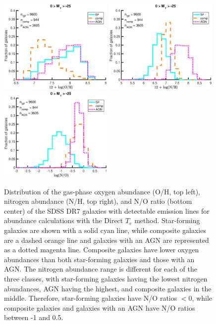 \begin{figure}
    \includegraphics[width=0.49\textwidth]{Images/GV/1sig_all_BPT_t3_12logOHrelations_dust_hist}
    \includegraphics[width=0.49\textwidth]{Images/GV/1sig_all_BPT_t3_12logNHrelations_dust_hist}
    \includegraphics[width=0.49\textwidth]{Images/GV/1sig_all_BPT_t3_logNOrelations_dust_hist}
    \caption[Abundance distributions for star-forming, composite, and AGN 
    galaxies]{Distribution of the gas-phase oxygen abundance (O/H, top left), 
    nitrogen abundance (N/H, top right), and N/O ratio (bottom center) of the 
    SDSS DR7 galaxies with detectable emission lines for abundance calculations 
    with the Direct $T_e$ method.  Star-forming galaxies are shown with a solid 
    cyan line, while composite galaxies are a dashed orange line and galaxies 
    with an AGN are represented as a dotted magenta line.  Composite galaxies 
    have lower oxygen abundances than both star-forming galaxies and those with 
    an AGN.  The nitrogen abundance range is different for each of the three 
    classes, with star-forming galaxies having the lowest nitrogen abundances, 
    AGN having the highest, and composite galaxies in the middle.  Therefore, 
    star-forming galaxies have N/O ratios $< 0$, while composite galaxies and 
    galaxies with an AGN have N/O ratios between -1 and 0.5.}
    \label{fig:BPT_abund}
\end{figure}

